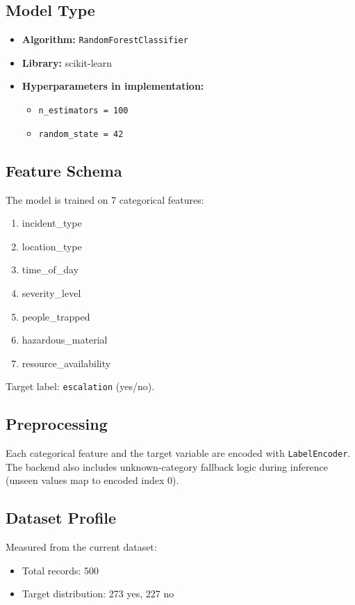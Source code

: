 \documentclass[12pt,a4paper]{article}
\begin{document}
\subsection{Model Type}
\begin{itemize}[leftmargin=1.5em]
  \item \textbf{Algorithm:} \texttt{RandomForestClassifier}
  \item \textbf{Library:} scikit-learn
  \item \textbf{Hyperparameters in implementation:}
  \begin{itemize}[leftmargin=1.5em]
    \item \texttt{n\_estimators = 100}
    \item \texttt{random\_state = 42}
  \end{itemize}
\end{itemize}

\subsection{Feature Schema}
The model is trained on 7 categorical features:
\begin{enumerate}[leftmargin=1.5em]
  \item incident\_type
  \item location\_type
  \item time\_of\_day
  \item severity\_level
  \item people\_trapped
  \item hazardous\_material
  \item resource\_availability
\end{enumerate}
Target label: \texttt{escalation} (yes/no).

\subsection{Preprocessing}
Each categorical feature and the target variable are encoded with \texttt{LabelEncoder}. The backend also includes unknown-category fallback logic during inference (unseen values map to encoded index 0).

\subsection{Dataset Profile}
Measured from the current dataset:
\begin{itemize}[leftmargin=1.5em]
  \item Total records: 500
  \item Target distribution: 273 yes, 227 no
\end{itemize}
\end{document}

